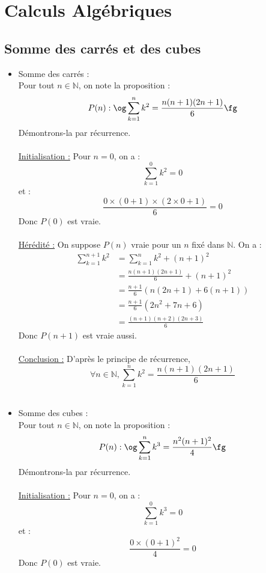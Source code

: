 \documentclass[../main.tex]{subfiles}
\begin{document}
\setcounter{chapter}{0}
\chapter{Calculs Algébriques}
\tableofcontents
\clearpage

\setcounter{section}{19}
\section{Somme des carrés et des cubes}
\begin{itemize}
    \item Somme des carrés : \\
    Pour tout $n \in \mathbb{N}$, on note la proposition :
    $$P(n): \text\og\sum_{k=1}^{n}k^2=\frac{n(n+1)(2n+1)}{6}\text\fg$$
    Démontrons-la par récurrence.\\
    \\
    \underline{Initialisation :} Pour $n=0$, on a :
    $$\sum_{k=1}^{0}k^2=0$$
    et :
    $$\frac{0\times(0+1)\times(2\times0+1)}{6}=0$$
    Donc $P(0)$ est vraie.\\
    \\
    \underline{Hérédité :} On suppose $P(n)$ vraie pour un $n$ fixé dans
    $\mathbb N$. On a :
    \begin{align*}
    \sum_{k=1}^{n+1}k^2 & = \sum_{k=1}^{n}k^2 + (n+1)^2 \\
    & = \frac{n(n+1)(2n+1)}{6} + (n+1)^2 \\
    & = \frac{n+1}{6}(n(2n+1) + 6(n+1)) \\
    & = \frac{n+1}{6}(2n^2 + 7n + 6) \\
    & = \frac{(n+1)(n+2)(2n+3)}{6}
    \end{align*}
    Donc $P(n+1)$ est vraie aussi.\\
    \\
    \underline{Conclusion :} D'après le principe de récurrence,
    $$\forall n \in \mathbb{N}, \sum_{k=1}^{n}k^2=\frac{n(n+1)(2n+1)}{6}$$
    \\
    \item Somme des cubes : \\
    Pour tout $n \in \mathbb{N}$, on note la proposition :
    $$P(n): \text\og\sum_{k=1}^{n}k^3=\frac{n^2(n+1)^2}{4}\text\fg$$
    Démontrons-la par récurrence.\\
    \\
    \underline{Initialisation :} Pour $n=0$, on a :
    $$\sum_{k=1}^{0}k^3=0$$
    et :
    $$\frac{0\times(0+1)^2}{4}=0$$
    Donc $P(0)$ est vraie.\\

\end{itemize}
\end{document}
